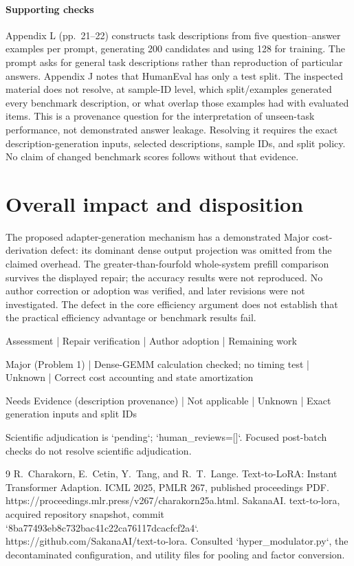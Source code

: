 \documentclass[10pt]{article}
\begin{document}
\paragraph*{Supporting checks}\mbox{}\par
Appendix L (pp. 21–22) constructs task descriptions from five question–answer examples per prompt, generating 200 candidates and using 128 for training. The prompt asks for general task descriptions rather than reproduction of particular answers. Appendix J notes that HumanEval has only a test split. The inspected material does not resolve, at sample-ID level, which split/examples generated every benchmark description, or what overlap those examples had with evaluated items. This is a provenance question for the interpretation of unseen-task performance, not demonstrated answer leakage. Resolving it requires the exact description-generation inputs, selected descriptions, sample IDs, and split policy. No claim of changed benchmark scores follows without that evidence.\par
\section*{Overall impact and disposition}
The proposed adapter-generation mechanism has a demonstrated Major cost-derivation defect: its dominant dense output projection was omitted from the claimed overhead. The greater-than-fourfold whole-system prefill comparison survives the displayed repair; the accuracy results were not reproduced. No author correction or adoption was verified, and later revisions were not investigated. The defect in the core efficiency argument does not establish that the practical efficiency advantage or benchmark results fail.\par
Assessment | Repair verification | Author adoption | Remaining work\par
Major (Problem 1) | Dense-GEMM calculation checked; no timing test | Unknown | Correct cost accounting and state amortization\par
Needs Evidence (description provenance) | Not applicable | Unknown | Exact generation inputs and split IDs\par
Scientific adjudication is `pending`; `human\_reviews=[]`. Focused post-batch checks do not resolve scientific adjudication.\par
9 R. Charakorn, E. Cetin, Y. Tang, and R. T. Lange. Text-to-LoRA: Instant Transformer Adaption. ICML 2025, PMLR 267, published proceedings PDF. https://proceedings.mlr.press/v267/charakorn25a.html. SakanaAI. text-to-lora, acquired repository snapshot, commit `8ba77493eb8c732bac41c22ca76117dcacfcf2a4`. https://github.com/SakanaAI/text-to-lora. Consulted `hyper\_modulator.py`, the decontaminated configuration, and utility files for pooling and factor conversion.\par
\end{document}
